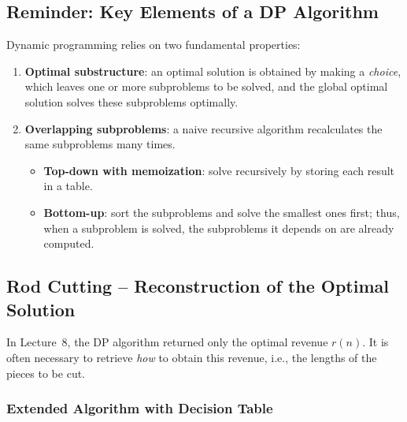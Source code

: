 
\subsection{Reminder: Key Elements of a DP Algorithm}

Dynamic programming relies on two fundamental properties:

\begin{enumerate}
  \item \textbf{Optimal substructure}: an optimal solution is obtained by making
        a \emph{choice}, which leaves one or more subproblems to be solved,
        and the global optimal solution solves these subproblems optimally.
  \item \textbf{Overlapping subproblems}: a naive recursive algorithm recalculates the same
        subproblems many times.
        \begin{itemize}
          \item \textbf{Top-down with memoization}: solve recursively by
                storing each result in a table.
          \item \textbf{Bottom-up}: sort the subproblems and solve the smallest
                ones first; thus, when a subproblem is solved, the
                subproblems it depends on are already computed.
        \end{itemize}
\end{enumerate}

\subsection{Rod Cutting – Reconstruction of the Optimal Solution}

In Lecture~8, the DP algorithm returned only the optimal revenue $r(n)$.
It is often necessary to retrieve \emph{how} to obtain this revenue, i.e.,
the lengths of the pieces to be cut.

\subsubsection{Extended Algorithm with Decision Table}

